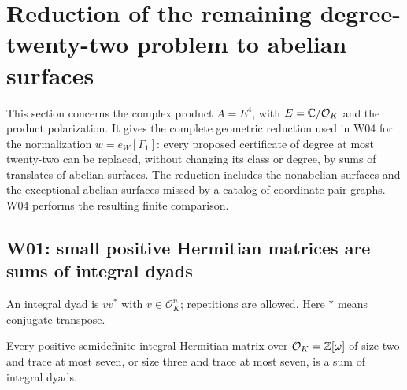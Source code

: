 \section{Reduction of the remaining degree-twenty-two problem to abelian surfaces}
\label{sec:small-surface-reduction}

This section concerns the complex product $A=E^4$, with $E=\mathbb C/\mathcal O_K$ and the product polarization. It gives the complete geometric reduction used in W04 for the normalization $w=e_W[\Gamma_1]$: every proposed certificate of degree at most twenty-two can be replaced, without changing its class or degree, by sums of translates of abelian surfaces. The reduction includes the nonabelian surfaces and the exceptional abelian surfaces missed by a catalog of coordinate-pair graphs. W04 performs the resulting finite comparison.

\subsection{W01: small positive Hermitian matrices are sums of integral dyads}

An integral dyad is $vv^*$ with $v\in\mathcal O_K^n$; repetitions are allowed. Here $*$ means conjugate transpose.

\begin{lemma}[W01]
Every positive semidefinite integral Hermitian matrix over $\mathcal O_K=\mathbb Z[\omega]$ of size two and trace at most seven, or size three and trace at most seven, is a sum of integral dyads.
\end{lemma}

